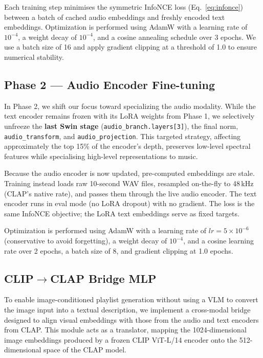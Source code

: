 \documentclass[11pt]{article}
\begin{document}
Each training step minimises the symmetric InfoNCE loss (Eq.~\ref{eq:infonce}) between
a batch of cached audio embeddings and freshly encoded text embeddings. Optimization is performed using AdamW with a learning rate of $10^{-4}$, a weight decay of $10^{-4}$, and a cosine annealing schedule over 3 epochs. We use a batch size of 16 and apply gradient clipping at a threshold of 1.0 to ensure numerical stability.

\subsection{Phase 2 — Audio Encoder Fine-tuning}
\label{sec:phase2}

In Phase 2, we shift our focus toward specializing the audio modality. While the text encoder remains frozen with its LoRA weights from Phase 1, we selectively unfreeze the \textbf{last Swin stage}
(\texttt{audio\_branch.layers[3]}), the final norm,
\texttt{audio\_transform}, and \texttt{audio\_projection}. This targeted strategy, affecting approximately the top 15\% of the encoder's depth, preserves
low-level spectral features while specialising high-level representations to music.

Because the audio encoder is now updated, pre-computed embeddings are stale.
Training instead loads raw 10-second WAV files, resampled on-the-fly to 48\,kHz
(CLAP's native rate), and passes them through the live audio encoder. The text
encoder runs in eval mode (no LoRA dropout) with no gradient. The loss is the same
InfoNCE objective; the LoRA text embeddings serve as fixed targets.

Optimization is performed using AdamW with a learning rate of $lr=5\times10^{-6}$ (conservative to avoid forgetting), a weight decay of $10^{-4}$, and a cosine learning rate over 2 epochs, a batch size of 8, and gradient clipping at 1.0 epochs.


\subsection{\texorpdfstring{CLIP$\to$CLAP}{CLIP-to-CLAP} Bridge MLP}
\label{sec:bridge}

To enable image-conditioned playlist generation without using a VLM to convert the image input into a textual description, we implement a cross-modal bridge designed to align visual embeddings with those from the audio and text encoders from CLAP. This module acts as a translator, mapping the 1024-dimensional image embeddings produced by a frozen CLIP ViT-L/14 encoder onto the 512-dimensional space of the CLAP model.
\end{document}
